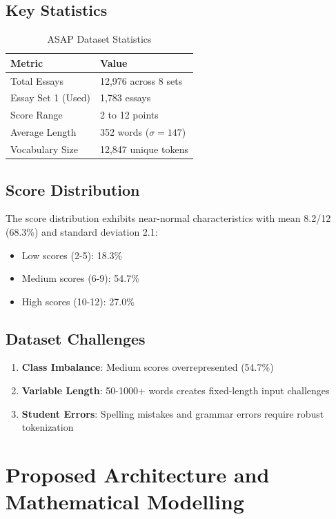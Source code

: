 \documentclass[12pt,a4paper]{article}
\begin{document}
\subsection{Key Statistics}
\begin{table}[H]
\centering
\caption{ASAP Dataset Statistics}
\begin{tabular}{ll}
\toprule
\textbf{Metric} & \textbf{Value} \\
\midrule
Total Essays & 12,976 across 8 sets \\
Essay Set 1 (Used) & 1,783 essays \\
Score Range & 2 to 12 points \\
Average Length & 352 words ($\sigma=147$) \\
Vocabulary Size & 12,847 unique tokens \\
\bottomrule
\end{tabular}
\end{table}

\subsection{Score Distribution}
The score distribution exhibits near-normal characteristics with mean 8.2/12 (68.3\%) and standard deviation 2.1:
\begin{itemize}
    \item Low scores (2-5): 18.3\%
    \item Medium scores (6-9): 54.7\%
    \item High scores (10-12): 27.0\%
\end{itemize}

\subsection{Dataset Challenges}
\begin{enumerate}
    \item \textbf{Class Imbalance}: Medium scores overrepresented (54.7\%)
    \item \textbf{Variable Length}: 50-1000+ words creates fixed-length input challenges
    \item \textbf{Student Errors}: Spelling mistakes and grammar errors require robust tokenization
\end{enumerate}

\newpage
\section{Proposed Architecture and Mathematical Modelling}
\end{document}
